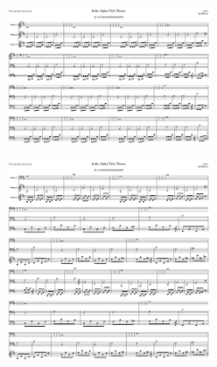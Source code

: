 \begin{figure}[H]                                             
{                                                             
  \setlength{\tabcolsep}{3.0pt}                               
  \setlength\cmidrulewidth{\heavyrulewidth} %
    \begin{subfigure}{0.5\textwidth}                            
  \includegraphics[width=6cm]{music/title_no_63_page_1001.png}%
    \end{subfigure}                                             
  \begin{subfigure}{0.5\textwidth}                            
  \includegraphics[width=6cm]{music/title_no_64_page_1001.png}%
    \end{subfigure}                                             
}                                                             
\end{figure}                                                  


